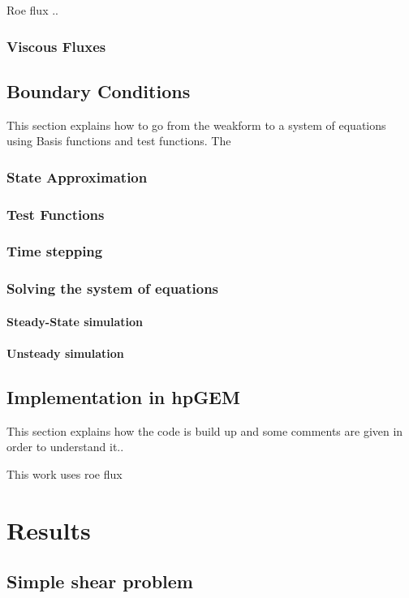 \documentclass{report}
\begin{document}
Roe flux ..

\subsection{Viscous Fluxes}
\label{ss:ViscousFluxes}


\section{Boundary Conditions}
This section explains how to go from the weakform to a system of equations using Basis functions and test functions. The

\subsection{State Approximation}

\subsection{Test Functions}

\subsection{Time stepping}

\subsection{Solving the system of equations}
\subsubsection{Steady-State simulation}
\subsubsection{Unsteady simulation} 


\section{Implementation in hpGEM}
This section explains how the code is build up and some comments are given in order to understand it..

This work uses roe flux

\chapter{Results}
\section{Simple shear problem}
\end{document}
